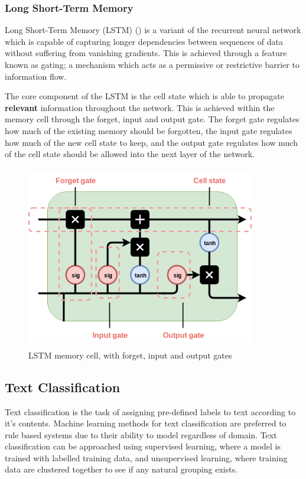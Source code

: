 \subsubsection{Long Short-Term Memory}
Long Short-Term Memory (LSTM) (\cite{Hochreiter1997}) is a variant of the recurrent neural network which is capable of capturing longer dependencies between sequences of data without suffering from vanishing gradients. This is achieved through a feature known as gating; a mechanism which acts as a permissive or restrictive barrier to information flow. 

\noindent
\newline
The core component of the LSTM is the cell state which is able to propagate \textbf{relevant} information throughout the network. This is achieved within the memory cell through the forget, input and output gate. The forget gate regulates how much of the existing memory should be forgotten, the input gate regulates how much of the new cell state to keep, and the output gate regulates how much of the cell state should be allowed into the next layer of the network.

\begin{figure}[h]
	\includegraphics[width=10cm, height=8cm]{./figures/fig4}
	\centering
	\caption{LSTM memory cell, with forget, input and output gates}
	\label{fig:fig4}
\end{figure}

\subsection{Text Classification}
Text classification is the task of assigning pre-defined labels to text according to it's contents. Machine learning methods for text classification are preferred to rule based systems due to their ability to model regardless of domain. Text classification can be approached using supervised learning, where a model is trained with labelled training data, and unsupervised learning, where training data are clustered together to see if any natural grouping exists.

